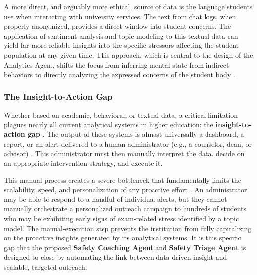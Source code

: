 A more direct, and arguably more ethical, source of data is the language students use when interacting with university services. The text from chat logs, when properly anonymized, provides a direct window into student concerns. The application of sentiment analysis and topic modeling to this textual data can yield far more reliable insights into the specific stressors affecting the student population at any given time. This approach, which is central to the design of the Analytics Agent, shifts the focus from inferring mental state from indirect behaviors to directly analyzing the expressed concerns of the student body \cite{paolucci2024wellbeinganalytics}.

\subsubsection{The Insight-to-Action Gap}
Whether based on academic, behavioral, or textual data, a critical limitation plagues nearly all current analytical systems in higher education: the \textbf{insight-to-action gap} \cite{jorno2018actionableinsight}. The output of these systems is almost universally a dashboard, a report, or an alert delivered to a human administrator (e.g., a counselor, dean, or advisor) \cite{susnjak2022dashboard}. This administrator must then manually interpret the data, decide on an appropriate intervention strategy, and execute it.

This manual process creates a severe bottleneck that fundamentally limits the scalability, speed, and personalization of any proactive effort \cite{kaliisa2023hypedashboards}. An administrator may be able to respond to a handful of individual alerts, but they cannot manually orchestrate a personalized outreach campaign to hundreds of students who may be exhibiting early signs of exam-related stress identified by a topic model. The manual-execution step prevents the institution from fully capitalizing on the proactive insights generated by its analytical systems. It is this specific gap that the proposed \textbf{Safety Coaching Agent} and \textbf{Safety Triage Agent} is designed to close by automating the link between data-driven insight and scalable, targeted outreach.


